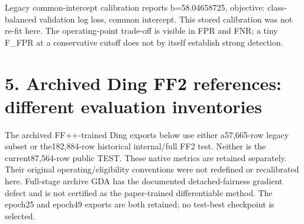 \documentclass[10pt]{article}
\begin{document}
Legacy common-intercept calibration reports b=58.04658725, objective: class-balanced validation log loss, common intercept. This stored calibration was not re-fit here. The operating-point trade-off is visible in FPR and FNR; a tiny F\_FPR at a conservative cutoff does not by itself establish strong detection.

\section*{5. Archived Ding FF2 references: different evaluation inventories}
The archived FF++-trained Ding exports below use either a57,665-row legacy subset or the182,884-row historical internal/full FF2 test. Neither is the current87,564-row public TEST. These native metrics are retained separately. Their original operating/eligibility conventions were not redefined or recalibrated here. Full-stage archive GDA has the documented detached-fairness gradient defect and is not certified as the paper-trained differentiable method. The epoch25 and epoch49 exports are both retained; no test-best checkpoint is selected.
\end{document}
